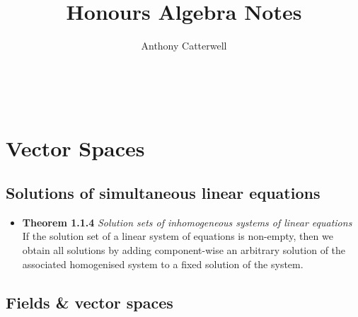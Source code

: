 \documentclass[11pt,a4paper]{article}
\title{Honours Algebra Notes}
\author{Anthony Catterwell}
\begin{document}
\maketitle
\tableofcontents

\break\

\section{Vector Spaces}

\subsection{Solutions of simultaneous linear equations}

\begin{itemize}

    \item \textbf{Theorem 1.1.4} \emph{Solution sets of inhomogeneous systems of linear
        equations} \\
        If the solution set of a linear system of equations is non-empty,
        then we obtain all solutions by adding component-wise an arbitrary solution
        of the associated homogenised system to a fixed solution of the system.
\end{itemize}

\subsection{Fields \& vector spaces}
\end{document}
